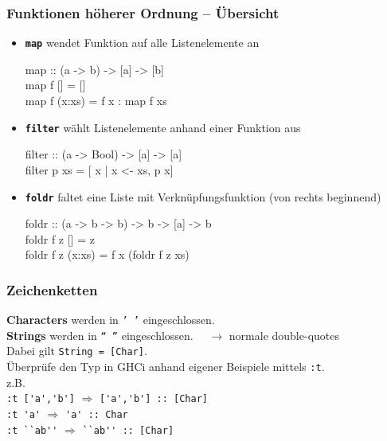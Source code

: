 \documentclass[aspectratio=1610,onlymath, ngerman]{beamer}
\renewcommand{\emph}[1]{\textbf{#1}}
\begin{document}
	\begin{frame}\frametitle{Funktionen höherer Ordnung -- Übersicht}
		\normalsize 
		\begin{itemize}
			\item \texttt{\textbf{map}} wendet Funktion auf alle Listenelemente an \\
				\begin{ttfamily}
					map :: (a -> b) -> [a] -> [b] \\
					map f [] = [] \\
					map f (x:xs) = f x : map f xs
				\end{ttfamily}
			\medskip
			\item \texttt{\textbf{filter}} wählt Listenelemente anhand einer Funktion aus \\
				\begin{ttfamily}
					filter :: (a -> Bool) -> [a] -> [a] \\
					filter p xs = [ x | x <- xs, p x]
				\end{ttfamily}
			\medskip
			\item \texttt{\textbf{foldr}} faltet eine Liste mit Verknüpfungsfunktion (von rechts beginnend) \\
				\begin{ttfamily}
					foldr :: (a -> b -> b) -> b -> [a] -> b \\
					foldr f z []     = z \\
					foldr f z (x:xs) = f x (foldr f z xs) 
				\end{ttfamily}
		\end{itemize}
	\end{frame}

	\begin{frame} \frametitle{Zeichenketten}
	\normalsize
		\emph{Characters} werden in \texttt{' '} eingeschlossen. \\
		\emph{Strings} werden in \texttt{`` ''} eingeschlossen. $\quad \rightarrow$ normale double-quotes \\
		\bigskip \pause
		Dabei gilt \texttt{String = [Char]}. \\
		\bigskip \pause
		Überprüfe den Typ in GHCi anhand eigener Beispiele mittels \texttt{:t}.\\
		z.B. \\
		\lstinline{:t ['a','b']} $\Longrightarrow$ \lstinline{['a','b'] :: [Char]} \\
		\lstinline{:t 'a'}      $\Longrightarrow$ \lstinline{'a' :: Char} \\
		\lstinline{:t ``ab''}     $\Longrightarrow$ \lstinline{``ab'' :: [Char]} 
	\end{frame}
\end{document}
